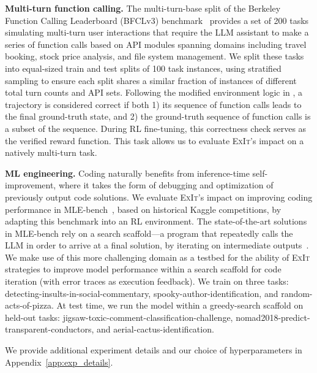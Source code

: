 \documentclass[10pt]{article} %
\newcommand{\methodname}{\textsc{ExIt}}
\begin{document}
\textbf{Multi-turn function calling.} The multi-turn-base split of the Berkeley Function Calling Leaderboard (BFCLv3) benchmark~\citep{patil2025bfcl} provides a set of 200 tasks simulating multi-turn user interactions that require the LLM assistant to make a series of function calls based on API modules spanning domains including travel booking, stock price analysis, and file system management. We split these tasks into equal-sized train and test splits of 100 task instances, using stratified sampling to ensure each split shares a similar fraction of instances of different total turn counts and API sets. Following the modified environment logic in \citet{bespoke_improving_multi_turn_tool_use}, a trajectory is considered correct if both 1) its sequence of function calls leads to the final ground-truth state, and 2) the ground-truth sequence of function calls is a subset of the sequence. During RL fine-tuning, this correctness check serves as the verified reward function. This task allows us to evaluate \methodname{}'s impact on a natively multi-turn task.

\textbf{ML engineering.} Coding naturally benefits from inference-time self-improvement, where it takes the form of debugging and optimization of previously output code solutions. 
We evaluate \methodname{}'s impact on improving coding performance in MLE-bench~\citep{chan2024mle}, based on historical Kaggle competitions, by adapting this benchmark into an RL environment. The state-of-the-art solutions in MLE-bench rely on a search scaffold—a program that repeatedly calls the LLM in order to arrive at a final solution, by iterating on intermediate outputs~\citep{jiang2025aide,liu2025ml,toledo2025ai,zhao2025automated}. We make use of this more challenging domain as a testbed for the ability of \methodname{} strategies to improve model performance within a search scaffold for code iteration (with error traces as execution feedback).
We train on three tasks: detecting-insults-in-social-commentary, spooky-author-identification, and random-acts-of-pizza. At test time, we run the model within a greedy-search scaffold on held-out tasks: jigsaw-toxic-comment-classification-challenge, nomad2018-predict-transparent-conductors, and aerial-cactus-identification.

We provide additional experiment details and our choice of hyperparameters in Appendix~\ref{app:exp_details}. 
\end{document}
